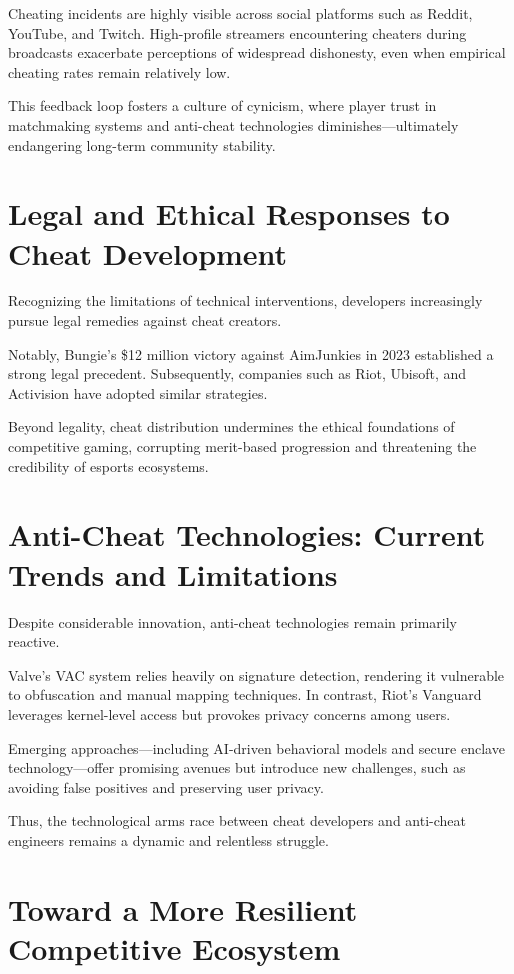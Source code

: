 Cheating incidents are highly visible across social platforms such as Reddit, YouTube, and Twitch.  
High-profile streamers encountering cheaters during broadcasts exacerbate perceptions of widespread dishonesty, even when empirical cheating rates remain relatively low.

This feedback loop fosters a culture of cynicism, where player trust in matchmaking systems and anti-cheat technologies diminishes—ultimately endangering long-term community stability.

\section{Legal and Ethical Responses to Cheat Development}

Recognizing the limitations of technical interventions, developers increasingly pursue legal remedies against cheat creators.

Notably, Bungie’s \$12 million victory against AimJunkies in 2023 established a strong legal precedent.  
Subsequently, companies such as Riot, Ubisoft, and Activision have adopted similar strategies.

Beyond legality, cheat distribution undermines the ethical foundations of competitive gaming, corrupting merit-based progression and threatening the credibility of esports ecosystems.

\section{Anti-Cheat Technologies: Current Trends and Limitations}

Despite considerable innovation, anti-cheat technologies remain primarily reactive.

Valve's VAC system relies heavily on signature detection, rendering it vulnerable to obfuscation and manual mapping techniques.  
In contrast, Riot’s Vanguard leverages kernel-level access but provokes privacy concerns among users.

Emerging approaches—including AI-driven behavioral models and secure enclave technology—offer promising avenues but introduce new challenges, such as avoiding false positives and preserving user privacy.

Thus, the technological arms race between cheat developers and anti-cheat engineers remains a dynamic and relentless struggle.

\section{Toward a More Resilient Competitive Ecosystem}

